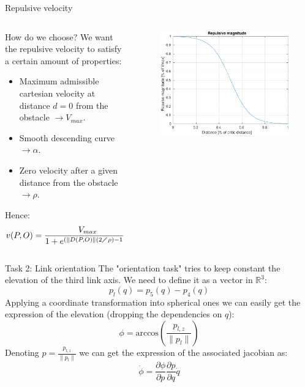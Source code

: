 \documentclass[11pt]{beamer}
\newcommand{\norm}[1]{\parallel{#1}\parallel}
\newcommand{\R}{\mathbb{R}}
\newcommand{\diff}[2]{\frac{\partial{#1}}{\partial{#2}}}
\begin{document}
\begin{frame}{Repulsive velocity}
\begin{columns}
\begin{column}{.5\textwidth}
\begin{block}{How do we choose?}
We want the repulsive velocity to satisfy a certain amount of properties:
\begin{itemize}
\item Maximum admissible cartesian velocity at distance $d=0$ from the obstacle $\rightarrow V_{max}$.
\item Smooth descending curve $\rightarrow \alpha$.
\item Zero velocity after a given distance from the obstacle $\rightarrow \rho$.
\end{itemize}
\end{block} 
Hence:
\[
v(P,O) = \frac{V_{max}}{1+e^{(\norm{D(P,O)}(2\diagup\rho)-1)\alpha}}
\]
\end{column}
\begin{column}{.5\textwidth}
\begin{figure}[H]
\includegraphics[scale=.45]{./images/repulsive_velocity.pdf}
\end{figure}
\end{column}
\end{columns}
\end{frame}

\begin{frame}{Task 2: Link orientation}
The "orientation task" tries to keep constant the elevation of the third link axis. We need to define it as a vector in $\R^3$:
\[
p_l(q) = p_5(q) - p_4(q)
\]
Applying a coordinate transformation into spherical ones we can easily get the expression of the elevation (dropping the dependencies on $q$):
\[
\phi = \mathrm{arccos}(\frac{p_{l,z}}{\norm{p_l}})
\]
Denoting $p = \frac{p_{l,z}}{\norm{p_l}}$ we can get the expression of the associated jacobian as:
\[
\dot{\phi} = \diff{\phi}{p}\diff{p}{q}\dot{q}
\]
\end{frame}
\end{document}
